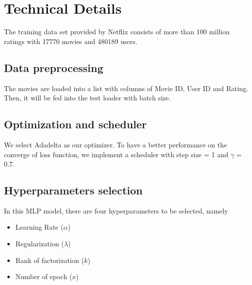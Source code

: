 \documentclass[final]{cvpr}
\begin{document}
\section{Technical Details}
The training data set provided by Netflix consists of more than 100 million ratings with 17770 movies and 480189 users.

\subsection{Data preprocessing}
The movies are loaded into a list with columns of Movie ID, User ID and Rating. Then, it will be fed into the test loader with batch size.





\subsection{Optimization and scheduler}
We select Adadelta as our optimizer. 
To have a better performance on the converge of loss function, we implement a scheduler with step size = 1 and $\gamma$ = 0.7.

\subsection{Hyperparameters selection}
In this MLP model, there are four hyperparameters to be selected, namely
\begin{itemize}
	\item Learning Rate ($\alpha$)
	\item Regularization ($\lambda$)
	\item Rank of factorization ($k$)
	\item Number of epoch ($x$)
\end{itemize}
\end{document}

